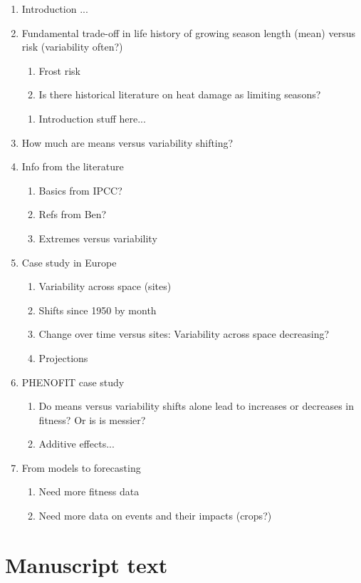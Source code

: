 \documentclass[11pt,letter]{article}
\begin{document}
\begin{enumerate}
\item Introduction ...
\item Fundamental trade-off in life history of growing season length (mean) versus risk (variability often?)
\begin{enumerate}
\item Frost risk
\item Is there historical literature on heat damage as limiting seasons?
\end{enumerate}
\begin{enumerate}
\item Introduction stuff here... 
\end{enumerate}
\item How much are means versus variability shifting?
\item Info from the literature
\begin{enumerate}
\item Basics from IPCC?
\item Refs from Ben?
\item Extremes versus variability
\end{enumerate}
\item Case study in Europe
\begin{enumerate}
\item Variability across space (sites)
\item Shifts since 1950 by month 
\item Change over time versus sites: Variability across space decreasing?
\item Projections
\end{enumerate}
\item PHENOFIT case study
\begin{enumerate}
\item Do means versus variability shifts alone lead to increases or decreases in fitness? Or is is messier?
\item Additive effects... 
\end{enumerate}
\item From models to forecasting
\begin{enumerate}
\item Need more fitness data
\item Need more data on events and their impacts (crops?)
\end{enumerate}
\end{enumerate}

\newpage
\section{Manuscript text} 
\end{document}

